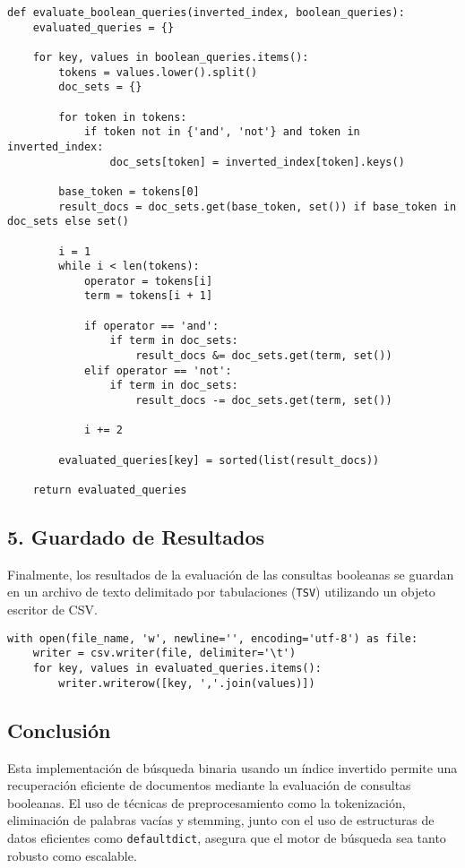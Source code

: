 \documentclass[11pt,english]{article}
\theoremstyle{plain}
\begin{document}
\begin{verbatim}
def evaluate_boolean_queries(inverted_index, boolean_queries):
    evaluated_queries = {}
    
    for key, values in boolean_queries.items():
        tokens = values.lower().split()
        doc_sets = {}
        
        for token in tokens:
            if token not in {'and', 'not'} and token in inverted_index:
                doc_sets[token] = inverted_index[token].keys()
        
        base_token = tokens[0]
        result_docs = doc_sets.get(base_token, set()) if base_token in doc_sets else set()
        
        i = 1
        while i < len(tokens):
            operator = tokens[i]
            term = tokens[i + 1]
            
            if operator == 'and':
                if term in doc_sets:
                    result_docs &= doc_sets.get(term, set())
            elif operator == 'not':
                if term in doc_sets:
                    result_docs -= doc_sets.get(term, set())
            
            i += 2
        
        evaluated_queries[key] = sorted(list(result_docs))
    
    return evaluated_queries
\end{verbatim}

\subsection*{5. Guardado de Resultados}

Finalmente, los resultados de la evaluación de las consultas booleanas se guardan en un archivo de texto delimitado por tabulaciones (\texttt{TSV}) utilizando un objeto escritor de CSV.

\begin{verbatim}
with open(file_name, 'w', newline='', encoding='utf-8') as file:
    writer = csv.writer(file, delimiter='\t')
    for key, values in evaluated_queries.items():
        writer.writerow([key, ','.join(values)])
\end{verbatim}

\subsection*{Conclusión}

Esta implementación de búsqueda binaria usando un índice invertido permite una recuperación eficiente de documentos mediante la evaluación de consultas booleanas. El uso de técnicas de preprocesamiento como la tokenización, eliminación de palabras vacías y stemming, junto con el uso de estructuras de datos eficientes como \texttt{defaultdict}, asegura que el motor de búsqueda sea tanto robusto como escalable.
\end{document}
